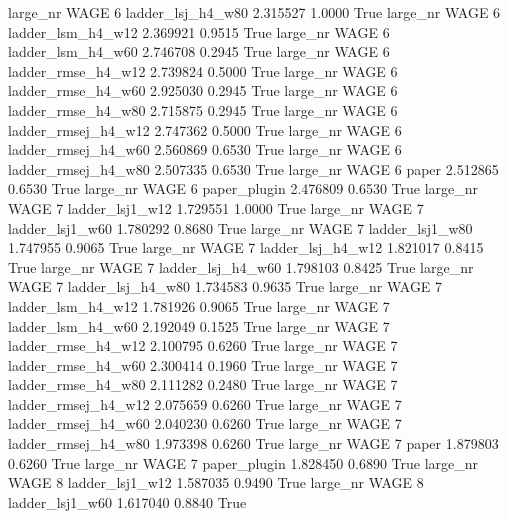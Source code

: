  large_nr     WAGE                 6   ladder_lsj_h4_w80    2.315527      1.0000    True
  large_nr     WAGE                 6   ladder_lsm_h4_w12    2.369921      0.9515    True
  large_nr     WAGE                 6   ladder_lsm_h4_w60    2.746708      0.2945    True
  large_nr     WAGE                 6  ladder_rmse_h4_w12    2.739824      0.5000    True
  large_nr     WAGE                 6  ladder_rmse_h4_w60    2.925030      0.2945    True
  large_nr     WAGE                 6  ladder_rmse_h4_w80    2.715875      0.2945    True
  large_nr     WAGE                 6 ladder_rmsej_h4_w12    2.747362      0.5000    True
  large_nr     WAGE                 6 ladder_rmsej_h4_w60    2.560869      0.6530    True
  large_nr     WAGE                 6 ladder_rmsej_h4_w80    2.507335      0.6530    True
  large_nr     WAGE                 6               paper    2.512865      0.6530    True
  large_nr     WAGE                 6        paper_plugin    2.476809      0.6530    True
  large_nr     WAGE                 7     ladder_lsj1_w12    1.729551      1.0000    True
  large_nr     WAGE                 7     ladder_lsj1_w60    1.780292      0.8680    True
  large_nr     WAGE                 7     ladder_lsj1_w80    1.747955      0.9065    True
  large_nr     WAGE                 7   ladder_lsj_h4_w12    1.821017      0.8415    True
  large_nr     WAGE                 7   ladder_lsj_h4_w60    1.798103      0.8425    True
  large_nr     WAGE                 7   ladder_lsj_h4_w80    1.734583      0.9635    True
  large_nr     WAGE                 7   ladder_lsm_h4_w12    1.781926      0.9065    True
  large_nr     WAGE                 7   ladder_lsm_h4_w60    2.192049      0.1525    True
  large_nr     WAGE                 7  ladder_rmse_h4_w12    2.100795      0.6260    True
  large_nr     WAGE                 7  ladder_rmse_h4_w60    2.300414      0.1960    True
  large_nr     WAGE                 7  ladder_rmse_h4_w80    2.111282      0.2480    True
  large_nr     WAGE                 7 ladder_rmsej_h4_w12    2.075659      0.6260    True
  large_nr     WAGE                 7 ladder_rmsej_h4_w60    2.040230      0.6260    True
  large_nr     WAGE                 7 ladder_rmsej_h4_w80    1.973398      0.6260    True
  large_nr     WAGE                 7               paper    1.879803      0.6260    True
  large_nr     WAGE                 7        paper_plugin    1.828450      0.6890    True
  large_nr     WAGE                 8     ladder_lsj1_w12    1.587035      0.9490    True
  large_nr     WAGE                 8     ladder_lsj1_w60    1.617040      0.8840    True
